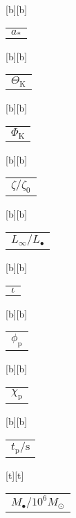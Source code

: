 %    
%
%
\begin{psfrags}%
\psfragscanon%
%
[b][b]{\color[rgb]{0,0,0}\setlength{\tabcolsep}{0pt}\begin{tabular}{c}{$a_\ast$}\end{tabular}}%
[b][b]{\color[rgb]{0,0,0}\setlength{\tabcolsep}{0pt}\begin{tabular}{c}{$\Theta_\mathrm{K}$}\end{tabular}}%
[b][b]{\color[rgb]{0,0,0}\setlength{\tabcolsep}{0pt}\begin{tabular}{c}{$\Phi_\mathrm{K}$}\end{tabular}}%
[b][b]{\color[rgb]{0,0,0}\setlength{\tabcolsep}{0pt}\begin{tabular}{c}{$\zeta/\zeta_0$}\end{tabular}}%
[b][b]{\color[rgb]{0,0,0}\setlength{\tabcolsep}{0pt}\begin{tabular}{c}{$L_\infty/L_\bullet$}\end{tabular}}%
[b][b]{\color[rgb]{0,0,0}\setlength{\tabcolsep}{0pt}\begin{tabular}{c}{$\iota$}\end{tabular}}%
[b][b]{\color[rgb]{0,0,0}\setlength{\tabcolsep}{0pt}\begin{tabular}{c}{$\phi_\mathrm{p}$}\end{tabular}}%
[b][b]{\color[rgb]{0,0,0}\setlength{\tabcolsep}{0pt}\begin{tabular}{c}{$\chi_\mathrm{p}$}\end{tabular}}%
[b][b]{\color[rgb]{0,0,0}\setlength{\tabcolsep}{0pt}\begin{tabular}{c}{$t_\mathrm{p}/\mathrm{s}$}\end{tabular}}%
[t][t]{\color[rgb]{0,0,0}\setlength{\tabcolsep}{0pt}\begin{tabular}{c}{$M_\bullet/10^6 M_\odot$}\end{tabular}}%

\end{psfrags}
